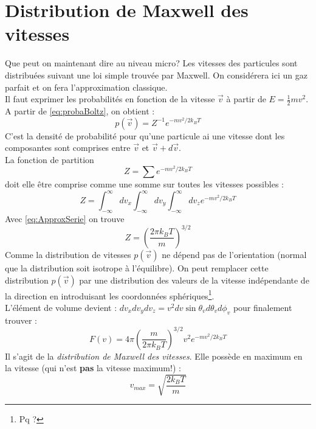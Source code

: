 \documentclass	[11pt, a4paper, openany]{book}
\begin{document}
		\section{Distribution de Maxwell des vitesses}
		Que peut on maintenant dire au niveau micro? Les vitesses des particules sont distribuées suivant
		une loi simple trouvée par Maxwell. On considérera ici un gaz parfait et on fera l'approximation
		classique.\\
		Il faut exprimer les probabilités en fonction de la vitesse $\vec{v}$ à partir de $E = \frac{1}{2}
		mv^2$. A partir de \autoref{eq:probaBoltz}, on obtient :
		\begin{equation}
			p(\vec{v}) = Z^{-1}e^{-mv^2/2k_BT}
		\end{equation}
		C'est la densité de probabilité pour qu'une particule ai une vitesse dont les composantes sont 
		comprises entre $\vec{v}$ et $\vec{v} +d\vec{v}$.\\
		La fonction de partition
		\begin{equation}
			Z = \sum e^{-mv^2/2k_BT}
		\end{equation}
		doit elle être comprise comme une somme sur toutes les vitesses possibles :
		\begin{equation}
			Z = \int_{-\infty}^\infty dv_x \int_{-\infty}^\infty dv_y \int_{-\infty}^\infty dv_z 
			e^{-mv^2/2k_BT}
		\end{equation}
		Avec \autoref{eq:ApproxSerie} on trouve
		\begin{equation}
			Z = \left(\dfrac{2\pi k_BT}{m}\right)^{3/2}
		\end{equation}
		Comme la distribution de vitesses $p(\vec{v})$ ne dépend pas de l'orientation (normal que la 
		distribution soit isotrope à l'équilibre). On peut remplacer cette distribution $p(\vec{v})$ 
		par une distribution des valeurs de la vitesse indépendante de la direction en introduisant
		les coordonnées sphériques\footnote{Pq ?}.\\
		L'élément de volume devient : $dv_xdv_ydv_z = v^2dv\sin\theta_vd\theta_vd\phi_v$ pour finalement
		trouver :
		\begin{equation}
			F(v) = 4\pi\left(\dfrac{m}{2\pi k_BT}\right)^{3/2} v^2 e^{-mv^2/2k_BT}
		\end{equation}
		Il s'agit de la \textit{distribution de Maxwell des vitesses}. Elle possède en maximum en la 
		vitesse (qui n'est \textbf{pas} la vitesse maximum!) : 
		\begin{equation}
			v_{max} = \sqrt{\dfrac{2k_BT}{m}}
		\end{equation}
\end{document}
